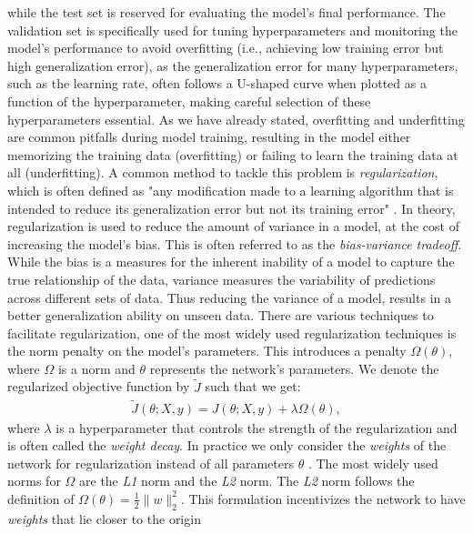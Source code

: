 while the test set is reserved for evaluating the model's final performance. 
The validation set is specifically used for tuning hyperparameters and monitoring the model's performance to avoid overfitting
(i.e., achieving low training error but high generalization error), as the generalization error
for many hyperparameters, such as the learning rate, often follows a U-shaped curve when plotted as a function
of the hyperparameter, making careful selection of these hyperparameters essential.
As we have already stated, overfitting and underfitting are common pitfalls during model training, resulting in the model either memorizing the training data (overfitting) 
or failing to learn the training data at all (underfitting).
 A common method to tackle this problem is \emph{regularization}, which is often defined as "any modification made to a learning algorithm that
is intended to reduce its generalization error but not its training error" \cite{Goodfellow-et-al-2016}.
In theory, regularization is used to reduce the amount of variance in a model, at the cost of increasing the model's
 bias. This is often referred to as the \emph{bias-variance tradeoff}. While the bias is a measures for the inherent inability of
 a model to capture the true relationship of the data, variance measures the variability of predictions across different 
sets of data. Thus reducing the variance of a model, results in a better generalization ability on unseen data.\cite{IBMRegularization}
There are various techniques to facilitate regularization, one of 
the most widely used regularization techniques is the norm penalty on the model's parameters. This introduces a penalty
\(\Omega(\theta)\), where \(\Omega\) is a norm and \(\theta\) represents the network's parameters.
We denote the regularized objective function by \(\tilde{J}\) such that we get:
\begin{align}
\tilde{J}(\theta; X, y) = J(\theta; X, y) + \lambda \Omega(\theta),
\end{align}
where \(\lambda\) is a hyperparameter that controls the strength of the regularization and is often called the \emph{weight decay}.
In practice we only consider the \emph{weights} of the network for regularization instead of  all parameters \(\theta\) \cite{Goodfellow-et-al-2016}.
The most widely used norms for \(\Omega\) are the \emph{L1} norm and the \emph{L2} norm.
The \emph{L2} norm follows the definition of \(\Omega(\theta) = \frac{1}{2} \|w\|_2^2\).
This formulation incentivizes the network to have \emph{weights} that lie closer to the origin

